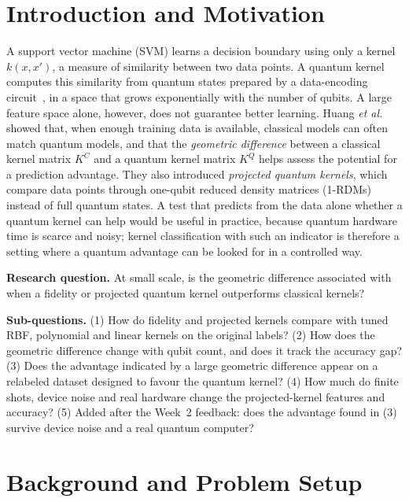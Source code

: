 \documentclass[conference]{IEEEtran}
\begin{document}
\section{Introduction and Motivation}
A support vector machine (SVM) learns a decision boundary using only a kernel $k(x,x')$, a measure of similarity between two data points. A quantum kernel computes this similarity from quantum states prepared by a data-encoding circuit~\cite{schuld2019,havlicek2019}, in a space that grows exponentially with the number of qubits. A large feature space alone, however, does not guarantee better learning. Huang \textit{et al.}~\cite{huang2021} showed that, when enough training data is available, classical models can often match quantum models, and that the \emph{geometric difference} between a classical kernel matrix $K^{C}$ and a quantum kernel matrix $K^{Q}$ helps assess the potential for a prediction advantage. They also introduced \emph{projected quantum kernels}, which compare data points through one-qubit reduced density matrices (1-RDMs) instead of full quantum states. A test that predicts from the data alone whether a quantum kernel can help would be useful in practice, because quantum hardware time is scarce and noisy; kernel classification with such an indicator is therefore a setting where a quantum advantage can be looked for in a controlled way.

\textbf{Research question.} At small scale, is the geometric difference associated with when a fidelity or projected quantum kernel outperforms classical kernels?

\textbf{Sub-questions.} (1) How do fidelity and projected kernels compare with tuned RBF, polynomial and linear kernels on the original labels? (2) How does the geometric difference change with qubit count, and does it track the accuracy gap? (3) Does the advantage indicated by a large geometric difference appear on a relabeled dataset designed to favour the quantum kernel? (4) How much do finite shots, device noise and real hardware change the projected-kernel features and accuracy? (5) Added after the Week~2 feedback: does the advantage found in (3) survive device noise and a real quantum computer?

\section{Background and Problem Setup}
\end{document}
